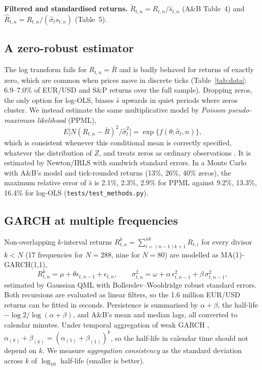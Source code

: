 \documentclass[11pt,a4paper]{article}
\begin{document}
\textbf{Filtered and standardised returns.} $\tilde R_{t,n}=R_{t,n}/\hat s_{t,n}$ (A\&B Table~4) and $\hat R_{t,n}=R_{t,n}/(\hat\sigma_t\hat s_{t,n})$ (Table~5).

\subsection{A zero-robust estimator}
The log transform fails for $R_{t,n}=\bar R$ and is badly behaved for returns of exactly zero, which are common when prices move in discrete ticks (Table~\ref{tab:data}: 6.9--7.0\% of EUR/USD and S\&P returns over the full sample). Dropping zeros, the only option for log-OLS, biases $\hat s$ upwards in quiet periods where zeros cluster. We instead estimate the same multiplicative model by \emph{Poisson pseudo-maximum likelihood} (PPML),
\begin{equation}
E\big[N(R_{t,n}-\bar R)^2/\hat\sigma_t^2\big]=\exp\{f(\theta;\hat\sigma_t,n)\},
\end{equation}
which is consistent whenever this conditional mean is correctly specified, whatever the distribution of $Z$, and treats zeros as ordinary observations \citep{SantosSilva2006}. It is estimated by Newton/IRLS with sandwich standard errors. In a Monte Carlo with A\&B's model and tick-rounded returns (13\%, 26\%, 40\% zeros), the maximum relative error of $\hat s$ is 2.1\%, 2.3\%, 2.9\% for PPML against 9.2\%, 13.3\%, 16.4\% for log-OLS (\texttt{tests/test\_methods.py}).

\subsection{GARCH at multiple frequencies}
Non-overlapping $k$-interval returns $R^{k}_{t,n}=\sum_{i=(n-1)k+1}^{nk}R_{t,i}$ for every divisor $k<N$ (17 frequencies for $N=288$, nine for $N=80$) are modelled as MA(1)-GARCH(1,1),
\[
R^k_{t,n}=\mu+\theta\epsilon_{t,n-1}+\epsilon_{t,n},\qquad
\sigma^2_{t,n}=\omega+\alpha\,\epsilon^2_{t,n-1}+\beta\,\sigma^2_{t,n-1},
\]
estimated by Gaussian QML with Bollerslev--Wooldridge robust standard errors. Both recursions are evaluated as linear filters, so the 1.6 million EUR/USD returns can be fitted in seconds. Persistence is summarised by $\alpha+\beta$, the half-life $-\log 2/\log(\alpha+\beta)$, and A\&B's mean and median lags, all converted to calendar minutes. Under temporal aggregation of weak GARCH \citep{DrostNijman1993}, $\alpha_{(k)}+\beta_{(k)}=(\alpha_{(1)}+\beta_{(1)})^k$, so the half-life in calendar time should not depend on $k$. We measure \emph{aggregation consistency} as the standard deviation across $k$ of $\log_{10}$ half-life (smaller is better).
\end{document}
